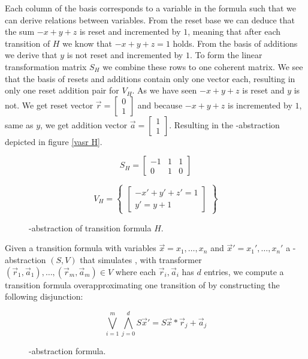 Each column of the basis corresponds to a variable in the formula such that we can derive relations between variables. From the reset base we can deduce that the sum $-x + y + z$ is reset and incremented by $1$, meaning that after each transition of $H$ we know that $-x + y + z = 1$ holds. From the basis of additions we derive that $y$ is not reset and incremented by $1$. To form the linear transformation matrix $S_H$ we combine these rows to one coherent matrix. We see that the basis of resets and additions contain only one vector each, resulting in only one reset addition pair for $V_H$. As we have seen $-x + y + z$ is reset and $y$ is not. We get reset vector $\vec{r} = \begin{bmatrix} 0 \\ 1 \end{bmatrix}$ and because $-x + y + z$ is incremented by $1$, same as $y$, we get addition vector $\vec{a} = \begin{bmatrix} 1 \\ 1 \end{bmatrix}$. Resulting in the \qvasr-abstraction depicted in figure \ref{vasr  H}.
\vspace*{-2em}
\begin{figure}[H]
	\begin{center}
		\begin{minipage}{0.3\linewidth}
			\begin{equation*}
				S_H = \begin{bmatrix} -1 & 1 & 1 \\ 0 & 1 & 0 \end{bmatrix}
			\end{equation*}
		\end{minipage}
		\begin{minipage}{0.6\linewidth}
			\begin{equation*}
				V_H = \begin{Bmatrix} \begin{bmatrix} -x' + y' + z' = 1\\ y' = y + 1 \end{bmatrix} \end{Bmatrix}
			\end{equation*}
		\end{minipage}
		\caption{\qvasr-abstraction of transition formula $H$.}
		\label{vasr H}
	\end{center}
\end{figure}
\vspace*{-2em}
Given a transition formula \trf with variables $\vec{x} = x_1, \ldots, x_n$ and $\vec{x}' = x_1', \ldots, x_n'$ a \qvasr-abstraction $(S, V)$ that simulates \trf, with transformer $(\vec{r}_1, \vec{a}_1), \ldots, (\vec{r}_m, \vec{a}_m) \in V$ where each $\vec{r}_i, \vec{a}_i$ has $d$ entries, we compute a transition formula overapproximating one transition of \trf by constructing the following disjunction:
\begin{figure*}[H]
	\begin{equation*}
		\bigvee\limits_{i=1}^m \bigwedge\limits_{j=0}^d S\vec{x}' = S\vec{x} * \vec{r}_j + \vec{a}_j
	\end{equation*}
	\label{vasrTrans}
	\caption{\qvasr-abstraction formula.}
\end{figure*}

